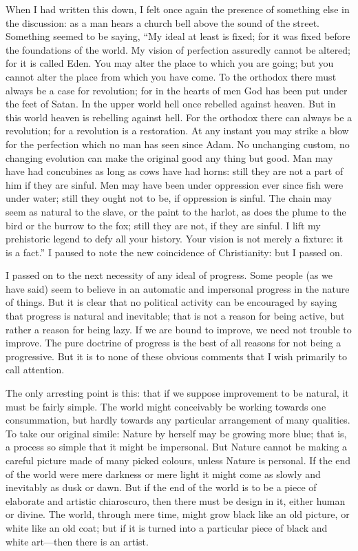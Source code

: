 When I had written this down, I felt once again the presence of something else in the discussion: as a man hears a church bell above the sound of the street. Something seemed to be saying, “My ideal at least is fixed; for it was fixed before the foundations of the world. My vision of perfection assuredly cannot be altered; for it is called Eden. You may alter the place to which you are going; but you cannot alter the place from which you have come. To the orthodox there must always be a case for revolution; for in the hearts of men God has been put under the feet of Satan. In the upper world hell once rebelled against heaven. But in this world heaven is rebelling against hell. For the orthodox there can always be a revolution; for a revolution is a restoration. At any instant you may strike a blow for the perfection which no man has seen since Adam. No unchanging custom, no changing evolution can make the original good any thing but good. Man may have had concubines as long as cows have had horns: still they are not a part of him if they are sinful. Men may have been under oppression ever since fish were under water; still they ought not to be, if oppression is sinful. The chain may seem as natural to the slave, or the paint to the harlot, as does the plume to the bird or the burrow to the fox; still they are not, if they are sinful. I lift my prehistoric legend to defy all your history. Your vision is not merely a fixture: it is a fact.” I paused to note the new coincidence of Christianity: but I passed on.

I passed on to the next necessity of any ideal of progress. Some people (as we have said) seem to believe in an automatic and impersonal progress in the nature of things. But it is clear that no political activity can be encouraged by saying that progress is natural and inevitable; that is not a reason for being active, but rather a reason for being lazy. If we are bound to improve, we need not trouble to improve. The pure doctrine of progress is the best of all reasons for not being a progressive. But it is to none of these obvious comments that I wish primarily to call attention.

The only arresting point is this: that if we suppose improvement to be natural, it must be fairly simple. The world might conceivably be working towards one consummation, but hardly towards any particular arrangement of many qualities. To take our original simile: Nature by herself may be growing more blue; that is, a process so simple that it might be impersonal. But Nature cannot be making a careful picture made of many picked colours, unless Nature is personal. If the end of the world were mere darkness or mere light it might come as slowly and inevitably as dusk or dawn. But if the end of the world is to be a piece of elaborate and artistic chiaroscuro, then there must be design in it, either human or divine. The world, through mere time, might grow black like an old picture, or white like an old coat; but if it is turned into a particular piece of black and white art—then there is an artist.

